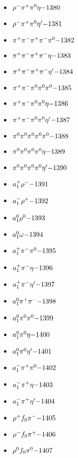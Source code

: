 \begin{multicols}{3}
\begin{itemize}
 \item $ \rho^{-} \pi^{+} \pi^{0} \eta \hfill{-1380}$
 \item $ \rho^{-} \pi^{+} \pi^{0} {\eta^{\prime}} \hfill{-1381}$
 \item $ \pi^{+} \pi^{-} \pi^{+} \pi^{-} \pi^{0} \hfill{-1382}$
 \item $ \pi^{+} \pi^{-} \pi^{+} \pi^{-} \eta \hfill{-1383}$
 \item $ \pi^{+} \pi^{-} \pi^{+} \pi^{-} {\eta^{\prime}} \hfill{-1384}$
 \item $ \pi^{+} \pi^{-} \pi^{0} \pi^{0} \pi^{0} \hfill{-1385}$
 \item $ \pi^{+} \pi^{-} \pi^{0} \pi^{0} \eta \hfill{-1386}$
 \item $ \pi^{+} \pi^{-} \pi^{0} \pi^{0} {\eta^{\prime}} \hfill{-1387}$
 \item $ \pi^{0} \pi^{0} \pi^{0} \pi^{0} \pi^{0} \hfill{-1388}$
 \item $ \pi^{0} \pi^{0} \pi^{0} \pi^{0} \eta \hfill{-1389}$
 \item $ \pi^{0} \pi^{0} \pi^{0} \pi^{0} {\eta^{\prime}} \hfill{-1390}$
 \item $ a_{1}^{+} \rho^{-} \hfill{-1391}$
 \item $ a_{1}^{-} \rho^{+} \hfill{-1392}$
 \item $ a_{1}^{0} \rho^{0} \hfill{-1393}$
 \item $ a_{1}^{0} \omega \hfill{-1394}$
 \item $ a_{1}^{+} \pi^{-} \pi^{0} \hfill{-1395}$
 \item $ a_{1}^{+} \pi^{-} \eta \hfill{-1396}$
 \item $ a_{1}^{+} \pi^{-} {\eta^{\prime}} \hfill{-1397}$
 \item $ a_{1}^{0} \pi^{+} \pi^{-} \hfill{-1398}$
 \item $ a_{1}^{0} \pi^{0} \pi^{0} \hfill{-1399}$
 \item $ a_{1}^{0} \pi^{0} \eta \hfill{-1400}$
 \item $ a_{1}^{0} \pi^{0} {\eta^{\prime}} \hfill{-1401}$
 \item $ a_{1}^{-} \pi^{+} \pi^{0} \hfill{-1402}$
 \item $ a_{1}^{-} \pi^{+} \eta \hfill{-1403}$
 \item $ a_{1}^{-} \pi^{+} {\eta^{\prime}} \hfill{-1404}$
 \item $ \rho^{+} f_{0} \pi^{-} \hfill{-1405}$
 \item $ \rho^{-} f_{0} \pi^{+} \hfill{-1406}$
 \item $ \rho^{0} f_{0} \pi^{0} \hfill{-1407}$

\end{itemize}
\end{multicols}
